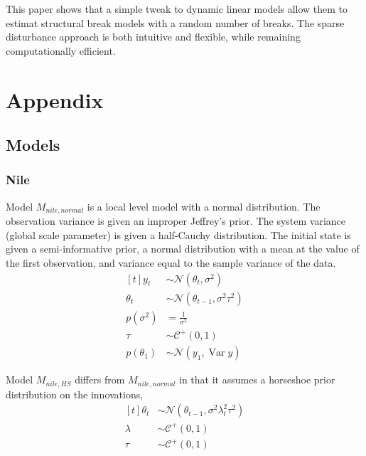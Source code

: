 \documentclass{article}
\newcommand{\paren}[1]{\ensuremath{\left(#1\right)}}
\newcommand{\dnorm}[1]{\ensuremath{\mathcal{N}\paren{#1}}}
\newcommand{\dhalfcauchy}[1]{\ensuremath{\mathcal{C}^{+}\paren{#1}}}
\DeclareMathOperator{\Var}{Var}
\begin{document}
This paper shows that a simple tweak to dynamic linear models allow them to estimat structural break models with a random number of breaks.
The sparse disturbance approach is both intuitive and flexible, while remaining computationally efficient.

\clearpage{}
\section{Appendix}
\label{sec:appendix}

\subsection{Models}
\label{sec:models}

\subsubsection{Nile}
\label{sec:nile-1}

Model $M_{nile,normal}$ is a local level model with a normal distribution.
The observation variance is given an improper Jeffrey's prior.
The system variance (global scale parameter) is given a half-Cauchy distribution. 
The initial state is given a semi-informative prior, a normal distribution with a mean at the value of the first observation, and variance equal to the sample variance of the data.
\begin{equation}
  \label{eq:11}
  \begin{aligned}[t]
    y_{t} &\sim \dnorm{\theta_{t}, \sigma^{2}} \\
    \theta_{t} &\sim \dnorm{\theta_{t - 1}, \sigma^{2} \tau^{2}} \\
    p(\sigma^{2}) &= \frac{1}{\sigma^{2}} \\
    \tau &\sim \dhalfcauchy{0, 1} \\
    p(\theta_{1}) &\sim \dnorm{y_{1}, \Var{y}}
  \end{aligned}
\end{equation}

Model $M_{nile,HS}$ differs from $M_{nile,normal}$ in that it assumes a horseshoe prior distribution on 
the innovations,
\begin{equation}
  \label{eq:18}
  \begin{aligned}[t]
    \theta_{t} &\sim \dnorm{\theta_{t - 1}, \sigma^{2} \lambda_{t}^{2} \tau^{2}} \\
    \lambda &\sim \dhalfcauchy{0, 1} \\
    \tau &\sim \dhalfcauchy{0, 1}
  \end{aligned}
\end{equation}
\end{document}
